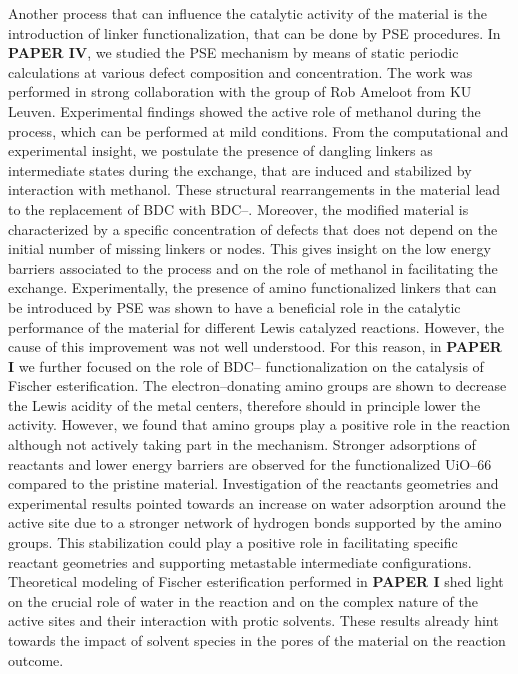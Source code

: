 \npar
Another process that can influence the catalytic activity of the material is the introduction of linker functionalization, that can be done by PSE procedures. In \textbf{PAPER IV}, we studied the PSE mechanism by means of static periodic calculations at various defect composition and concentration. The work was performed in strong collaboration with the group of Rob Ameloot from KU Leuven. Experimental findings showed the active role of methanol during the process, which can be performed at mild conditions. From the computational and experimental insight, we postulate the presence of dangling linkers as intermediate states during the exchange, that are induced and stabilized by interaction with methanol. These structural rearrangements in the material lead to the replacement of BDC with BDC--. Moreover, the modified material is characterized by a specific concentration of defects that does not depend on the initial number of missing linkers or nodes. This gives insight on the low energy barriers associated to the process and on the role of methanol in facilitating the exchange. 
\npar
Experimentally, the presence of amino functionalized linkers that can be introduced by PSE was shown to have a beneficial role in the catalytic performance of the material for different Lewis catalyzed reactions. However, the cause of this improvement was not well understood. For this reason, in \textbf{PAPER I} we further focused on the role of BDC-- functionalization on the catalysis of Fischer esterification. The electron--donating amino groups are shown to decrease the Lewis acidity of the metal centers, therefore should in principle lower the activity. However, we found that amino groups play a positive role in the reaction although not actively taking part in the mechanism. Stronger adsorptions of reactants and lower energy barriers are observed for the functionalized UiO--66 compared to the pristine material. Investigation of the reactants geometries and experimental results pointed towards an increase on water adsorption around the active site due to a stronger network of hydrogen bonds supported by the amino groups. This stabilization could play a positive role in facilitating specific reactant geometries and supporting metastable intermediate configurations. Theoretical modeling of Fischer esterification performed in \textbf{PAPER I} shed light on the crucial role of water in the reaction and on the complex nature of the active sites and their interaction with protic solvents. These results already hint towards the impact of solvent species in the pores of the material on the reaction outcome.
